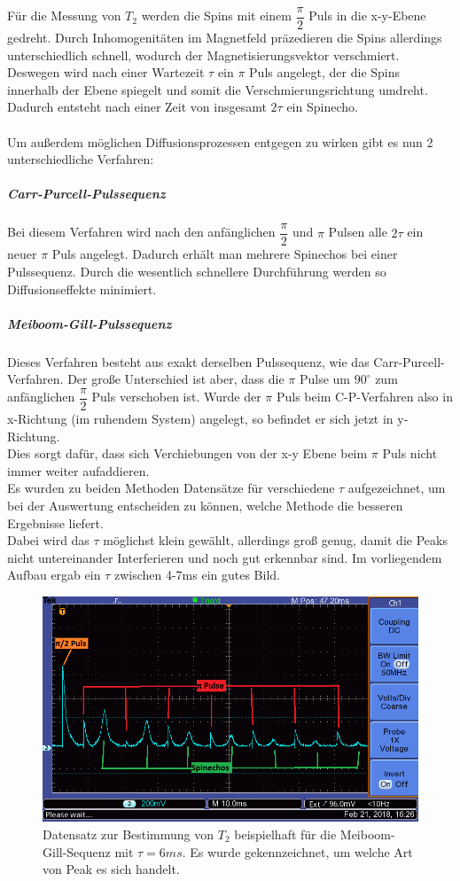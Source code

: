 \documentclass[12pt,a4paper]{article}
\begin{document}
Für die Messung von $T_2$ werden die Spins mit einem  $\dfrac{\pi}{2}$ Puls in die x-y-Ebene gedreht. Durch Inhomogenitäten im Magnetfeld präzedieren die Spins allerdings unterschiedlich schnell, wodurch der Magnetisierungsvektor verschmiert. Deswegen wird nach einer Wartezeit $\tau$ ein $\pi$ Puls angelegt, der die Spins innerhalb der Ebene spiegelt und somit die Verschmierungsrichtung umdreht. Dadurch entsteht nach einer Zeit von insgesamt $2 \tau$ ein Spinecho. \\ 
\\
Um außerdem möglichen Diffusionsprozessen entgegen zu wirken gibt es nun 2 unterschiedliche Verfahren:

\subparagraph{Carr-Purcell-Pulssequenz}
Bei diesem Verfahren wird nach den anfänglichen $\dfrac{\pi}{2}$ und $\pi$ Pulsen alle  $2 \tau$ ein neuer $\pi$ Puls angelegt. Dadurch erhält man mehrere Spinechos bei einer Pulssequenz. Durch die wesentlich schnellere Durchführung werden so Diffusionseffekte minimiert.
\subparagraph{Meiboom-Gill-Pulssequenz}
Dieses Verfahren besteht aus exakt derselben Pulssequenz, wie das Carr-Purcell-Verfahren. Der große Unterschied ist aber, dass  die $\pi$ Pulse um $90^{\circ}$ zum anfänglichen $\dfrac{\pi}{2}$ Puls verschoben ist. Wurde der $\pi$ Puls beim C-P-Verfahren also in x-Richtung (im ruhendem System) angelegt, so befindet er sich jetzt in y-Richtung.\\
Dies sorgt dafür, dass sich Verchiebungen von der x-y Ebene beim $\pi$ Puls nicht immer weiter aufaddieren.
\\
Es wurden zu beiden Methoden Datensätze für verschiedene $\tau$ aufgezeichnet, um bei der Auswertung entscheiden zu können, welche Methode die besseren Ergebnisse liefert.\\
Dabei wird das $\tau$ möglichst klein gewählt, allerdings groß genug, damit die Peaks nicht untereinander Interferieren und noch gut erkennbar sind. Im vorliegendem Aufbau ergab ein $\tau$ zwischen 4-7ms ein gutes Bild.\\

\begin{figure}
\centering
\includegraphics[scale=0.8]{Bilder/T2Beispiel.png}
\caption{Datensatz zur Bestimmung von $T_2$ beispielhaft für die Meiboom-Gill-Sequenz mit $\tau = 6ms$. Es wurde gekennzeichnet, um welche Art von Peak es sich handelt. }
\label{fig:T2Beispiel}
\end{figure}
\end{document}
